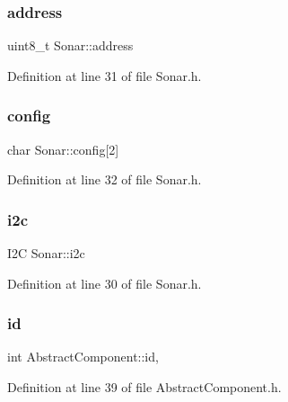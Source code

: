 \subsubsection{\texorpdfstring{address}{address}}
{\footnotesize\ttfamily uint8\+\_\+t Sonar\+::address\hspace{0.3cm}{\ttfamily [private]}}



Definition at line 31 of file Sonar.\+h.

\mbox{\label{class_sonar_a6a5dc5e466fc0c7a8cb2fc50af10db45}} 
\subsubsection{\texorpdfstring{config}{config}}
{\footnotesize\ttfamily char Sonar\+::config\mbox{[}2\mbox{]}\hspace{0.3cm}{\ttfamily [private]}}



Definition at line 32 of file Sonar.\+h.

\mbox{\label{class_sonar_ae6be174d7fc69e27ae5d932b26a5a003}} 
\subsubsection{\texorpdfstring{i2c}{i2c}}
{\footnotesize\ttfamily I2C Sonar\+::i2c\hspace{0.3cm}{\ttfamily [private]}}



Definition at line 30 of file Sonar.\+h.

\mbox{\label{class_abstract_component_a9c9c548149681b1a1dd935e66ed5dd11}} 
\subsubsection{\texorpdfstring{id}{id}}
{\footnotesize\ttfamily int Abstract\+Component\+::id\hspace{0.3cm}{\ttfamily [protected]}, {\ttfamily [inherited]}}



Definition at line 39 of file Abstract\+Component.\+h.

